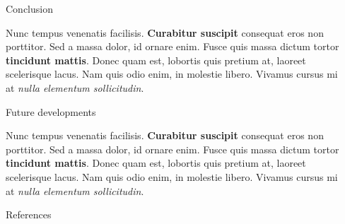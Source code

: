 \documentclass[final]{beamer}
\newlength{\sepwid}
\newlength{\onecolwid}
\begin{document}
\begin{frame}[t]
\begin{columns}[t]
\begin{column}{\sepwid}\end{column} %

\begin{column}{\onecolwid} %


\begin{block}{Conclusion}

Nunc tempus venenatis facilisis. \textbf{Curabitur suscipit} consequat eros non
porttitor. Sed a massa dolor, id ornare enim. Fusce quis massa dictum tortor
\textbf{tincidunt mattis}. Donec quam est, lobortis quis pretium at, laoreet
scelerisque lacus. Nam quis odio enim, in molestie libero. Vivamus cursus mi at
\textit{nulla elementum sollicitudin}.

\end{block}

\begin{block}{Future developments}

Nunc tempus venenatis facilisis. \textbf{Curabitur suscipit} consequat eros non
porttitor. Sed a massa dolor, id ornare enim. Fusce quis massa dictum tortor
\textbf{tincidunt mattis}. Donec quam est, lobortis quis pretium at, laoreet
scelerisque lacus. Nam quis odio enim, in molestie libero. Vivamus cursus mi at
\textit{nulla elementum sollicitudin}.

\end{block}


\begin{block}{References}

\nocite{*} %
\small{
\vspace{0.75in}}

\end{block}



\end{column}
\end{columns}
\end{frame}
\end{document}
